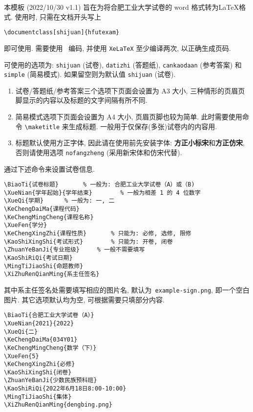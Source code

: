 \documentclass{hfutexam}
\begin{document}



\indent
本模板 (2022/10/30 v1.1) 旨在为将合肥工业大学试卷的 word 格式转为\LaTeX{}格式.
使用时, 只需在文档开头写上
\begin{lstlisting}
\documentclass[shijuan]{hfutexam}
\end{lstlisting}
即可使用.
需要使用~{\color{blue}{\lstinline|UTF-8|}} 编码, 并使用 \lstinline|XeLaTeX| 至少编译两次, 以正确生成页码.

\indent
可使用的选项为: \lstinline|shijuan| (试卷), \lstinline|datizhi| (答题纸), \lstinline|cankaodaan| (参考答案) 和 \lstinline|simple| (简易模式). 如果留空则为默认值 \lstinline|shijuan| (试卷).
\begin{enumerate}
\item 试卷/答题纸/参考答案三个选项下页面会设置为 A3 大小, 三种情形的页眉页脚显示的内容以及标题的文字间隔有所不同.
\item 简易模式选项下页面会设置为 A4 大小, 页眉页脚也较为简单. 此时需要使用命令 \lstinline|\maketitle| 来生成标题.
一般用于仅保存(多张)试卷内的内容用.
\item 标题默认使用方正字体, 因此请在使用前先安装字体: {\bfseries\titlesongti 方正小标宋}和{\bfseries\titlefangsong 方正仿宋}, 否则请使用选项 \lstinline|nofangzheng| (采用新宋体和仿宋代替).
\end{enumerate}


\indent
通过下述命令来设置试卷信息.
\begin{lstlisting}
\BiaoTi{试卷标题}		% 一般为: 合肥工业大学试卷（A）或（B)
\XueNian{学年起始}{学年结束}		% 一般为相差 1 的 4 位数字
\XueQi{学期}		% 一般为: 一, 二
\KeChengDaiMa{课程代码}
\KeChengMingCheng{课程名称}
\XueFen{学分}
\KeChengXingZhi{课程性质}		% 只能为: 必修, 选修, 限修
\KaoShiXingShi{考试形式}		% 只能为: 开卷, 闭卷
\ZhuanYeBanJi{专业班级}		% 一般不需要填写
\KaoShiRiQi{考试日期}
\MingTiJiaoShi{命题教师}
\XiZhuRenQianMing{系主任签名} 
\end{lstlisting}
其中系主任签名处需要填写相应的图片名, 默认为~{\color{blue}\lstinline|example-sign.png|}, 即一个空白图片. 其它选项默认均为空, 可根据需要只填部分内容.
\newpage
\textit{\color{blue}{示例:}}
\begin{lstlisting}
\BiaoTi{合肥工业大学试卷（A）}
\XueNian{2021}{2022}
\XueQi{二}
\KeChengDaiMa{034Y01}
\KeChengMingCheng{数学（下）}
\XueFen{5}
\KeChengXingZhi{必修}
\KaoShiXingShi{闭卷}
\ZhuanYeBanJi{少数民族预科班}
\KaoShiRiQi{2022年6月18日8:00-10:00}
\MingTiJiaoShi{集体}
\XiZhuRenQianMing{dengbing.png}
\end{lstlisting}
\end{document}
